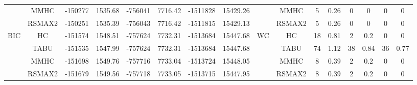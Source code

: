 \begin{table}[p]
{\begin{tabular}{cc||cc|cc|cc||cc|cc|cc|cc}
& MMHC &	-150277 & 	1535.68 & 	-756041 & 	7716.42 & 	-1511828 & 	15429.26 & 	& MMHC &	5 & 	0.26 & 	0 & 	0 & 	0 & 	0\tabularnewline													
& RSMAX2 &	-150251 & 	1535.39 & 	-756043 & 	7716.42 & 	-1511815 & 	15429.13 & 	& RSMAX2 &	5 & 	0.26 & 	0 & 	0 & 	0 & 	0\tabularnewline													
\hline																										
\multirow{4}{*}{BIC} & HC &	-151574 & 	1548.51 & 	-757624 & 	7732.31 & 	-1513684 & 	15447.68 & 	\multirow{4}{*}{WC} & HC &	18 & 	0.81 & 	2 & 	0.2 & 	0 & 	0\tabularnewline													
& TABU &	-151535 & 	1547.99 & 	-757624 & 	7732.31 & 	-1513684 & 	15447.68 & 	& TABU &	74 & 	1.12 & 	38 & 	0.84 & 	36 & 	0.77\tabularnewline													
& MMHC &	-151698 & 	1549.76 & 	-757716 & 	7733.04 & 	-1513724 & 	15448.05 & 	& MMHC &	8 & 	0.39 & 	2 & 	0.2 & 	0 & 	0\tabularnewline													
& RSMAX2 &	-151679 & 	1549.56 & 	-757718 & 	7733.05 & 	-1513715 & 	15447.95 & 	& RSMAX2 &	8 & 	0.39 & 	2 & 	0.2 & 	0 & 	0\tabularnewline													
\hline																										
\end{tabular}																										
}																										
\end{table}																										


